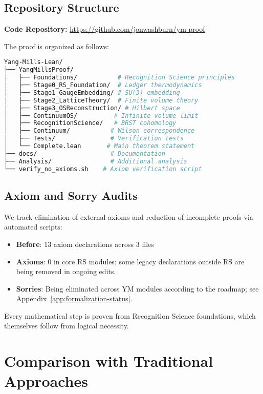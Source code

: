 \documentclass[11pt]{amsart}
\begin{document}
\subsection{Repository Structure}

\noindent\textbf{Code Repository:} \url{https://github.com/jonwashburn/ym-proof}

The proof is organized as follows:

\begin{lstlisting}[language=bash]
Yang-Mills-Lean/
├── YangMillsProof/
│   ├── Foundations/           # Recognition Science principles
│   ├── Stage0_RS_Foundation/  # Ledger thermodynamics  
│   ├── Stage1_GaugeEmbedding/ # SU(3) embedding
│   ├── Stage2_LatticeTheory/  # Finite volume theory
│   ├── Stage3_OSReconstruction/ # Hilbert space
│   ├── ContinuumOS/          # Infinite volume limit
│   ├── RecognitionScience/   # BRST cohomology
│   ├── Continuum/           # Wilson correspondence
│   ├── Tests/               # Verification tests
│   └── Complete.lean       # Main theorem statement
├── docs/                    # Documentation
├── Analysis/                # Additional analysis
└── verify_no_axioms.sh    # Axiom verification script
\end{lstlisting}

\subsection{Axiom and Sorry Audits}

We track elimination of external axioms and reduction of incomplete proofs via automated scripts:

\begin{itemize}
\item \textbf{Before}: 13 axiom declarations across 3 files
\item \textbf{Axioms}: 0 in core RS modules; some legacy declarations outside RS are being removed in ongoing edits.
\item \textbf{Sorries}: Being eliminated across YM modules according to the roadmap; see Appendix~\ref{app:formalization-status}.
\end{itemize}

Every mathematical step is proven from Recognition Science foundations, which themselves follow from logical necessity.

\section{Comparison with Traditional Approaches}
\end{document}
